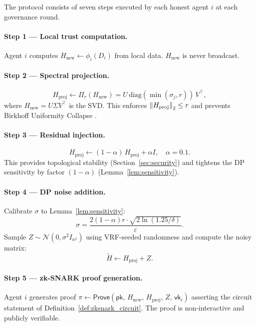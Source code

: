 The \fedsink{} protocol consists of seven steps executed by each honest agent $i$
at each governance round.

\paragraph{Step 1 — Local trust computation.}
Agent $i$ computes $H_{\mathrm{new}} \leftarrow \phi_i(D_i)$ from local data.
$H_{\mathrm{new}}$ is never broadcast.

\paragraph{Step 2 — Spectral projection.}
\begin{equation}
  \label{eq:spectral_proj}
  H_{\mathrm{proj}} \leftarrow \Pi_r(H_{\mathrm{new}}) = U\,\mathrm{diag}(\min(\sigma_j, r))\,V^\top,
\end{equation}
where $H_{\mathrm{new}} = U\Sigma V^\top$ is the SVD.  This enforces
$\left\|H_{\mathrm{proj}}\right\|_2 \leq r$ and prevents Birkhoff Uniformity Collapse
\cite{mcfs_iclr2027}.

\paragraph{Step 3 — Residual injection.}
\begin{equation}
  \label{eq:residual}
  H_{\mathrm{proj}} \leftarrow (1-\alpha)\,H_{\mathrm{proj}} + \alpha I,
  \quad \alpha = 0.1.
\end{equation}
This provides topological stability (Section~\ref{sec:security}) and tightens the DP
sensitivity by factor $(1-\alpha)$ (Lemma~\ref{lem:sensitivity}).

\paragraph{Step 4 — DP noise addition.}
Calibrate $\sigma$ to Lemma~\ref{lem:sensitivity}:
\begin{equation}
  \label{eq:sigma}
  \sigma = \frac{2(1-\alpha)r \cdot \sqrt{2\ln(1.25/\delta)}}{\varepsilon}.
\end{equation}
Sample $Z \sim \mathcal{N}(0, \sigma^2 I_{n^2})$ using VRF-seeded randomness and
compute the noisy matrix:
\begin{equation}
  \label{eq:noisy_matrix}
  \tilde{H} \leftarrow H_{\mathrm{proj}} + Z.
\end{equation}

\paragraph{Step 5 — zk-SNARK proof generation.}
Agent $i$ generates proof $\pi \leftarrow \mathsf{Prove}(\mathsf{pk},\,
H_{\mathrm{new}},\, H_{\mathrm{proj}},\, Z,\, \mathsf{vk}_i)$ asserting the circuit
statement of Definition~\ref{def:zksnark_circuit}.  The proof is non-interactive and
publicly verifiable.

